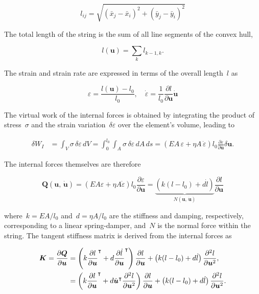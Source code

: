 \begin{equation}
l_{ij} = \sqrt{(\bar{x}_j - \bar{x}_i)^2 + (\bar{y}_j - \bar{y}_i)^2}
\end{equation}

The total length of the string is the sum of all line segments of the convex hull,

\begin{equation}
l(\boldsymbol{u}) = \sum_{k} l_{k-1,k}.
\end{equation}

The strain and strain rate are expressed in terms of the overall length~$l$ as

\begin{equation}
\varepsilon = \frac{l(\boldsymbol{u}) - l_{0}}{l_{0}}, \quad \dot{\varepsilon} = \frac{1}{l_{0}}\frac{\partial l}{\partial \boldsymbol{u}}\dot{\boldsymbol{u}}
\end{equation}

The virtual work of the internal forces is obtained by integrating the product of stress~$\sigma$ and the strain variation~$\delta \varepsilon$ over the element's volume, leading to

\begin{align}
\delta W_{I} &= \int_{V} \sigma\,\delta\varepsilon\,dV = \int_{0}^{l_{0}}\int_{A} \sigma\,\delta\varepsilon\,dA\,ds = \left(EA\,\varepsilon + \eta A\,\dot{\varepsilon}\right)l_{0}\frac{\partial\varepsilon}{\partial\boldsymbol{u}}\delta\boldsymbol{u}.
\end{align}

The internal forces themselves are therefore

\begin{equation}
\boldsymbol{Q}(\boldsymbol{u},\,\dot{\boldsymbol{u}}) = \left(EA\varepsilon + \eta A\dot{\varepsilon}\right)l_{0}\frac{\partial\varepsilon}{\partial\boldsymbol{u}} = \underbrace{\left(k(l - l_{0}) + d\dot{l}\right)}_{N(\boldsymbol{u},\,\dot{\boldsymbol{u}})}\frac{\partial l}{\partial\boldsymbol{u}}
\end{equation}

where~$k = EA/l_{0}$ and~$d = \eta A/l_{0}$ are the stiffness and damping, respectively, corresponding to a linear spring-damper, and~$N$ is the normal force within the string.
The tangent stiffness matrix is derived from the internal forces as

\begin{align}
\boldsymbol{K} = \frac{\partial\boldsymbol{Q}}{\partial\boldsymbol{u}} &= \left(k\frac{\partial l}{\partial\boldsymbol{u}}^\intercal + d\frac{\partial\dot{l}}{\partial\boldsymbol{u}}^\intercal\right)\frac{\partial l}{\partial\boldsymbol{u}} + \left(k(l - l_{0}) + d\dot{l}\right)\frac{\partial^2 l}{\partial\boldsymbol{u}^2}, \notag \\
&= \left(k\frac{\partial l}{\partial\boldsymbol{u}}^\intercal + d\dot{\boldsymbol{u}}^\intercal\frac{\partial^2 l}{\partial\boldsymbol{u}^2}\right)\frac{\partial l}{\partial\boldsymbol{u}} + \left(k(l - l_{0}) + d\dot{l}\right)\frac{\partial^2 l}{\partial\boldsymbol{u}^2}.
\end{align}

